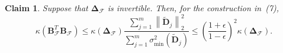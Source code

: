\documentclass[journal,draftcls,onecolumn]{IEEEtran}
\theoremstyle{mystyle}
\newtheorem{claim}{Claim}
\begin{document}

\begin{claim}
\label{claim:cond_num}
Suppose that $\mathbf{\Delta}_{\mathcal{F}}$ is invertible. Then, for the construction in~(7),
$$
\kappa\!\left(\mathbf{B}_{\mathcal{F}}^{T}\mathbf{B}_{\mathcal{F}}\right)
\leq
\kappa\!\left(\mathbf{\Delta}_{\mathcal{F}}\right)
\frac{\sum_{j=1}^{m}\left\|\tilde{\mathbf{D}}_{j}\right\|_{2}^{2}}
{\sum_{j=1}^{m}\sigma_{\min}^{2}\!\left(\tilde{\mathbf{D}}_{j}\right)}
\leq
\left(\frac{1+\epsilon}{1-\epsilon}\right)^{2}
\kappa\!\left(\mathbf{\Delta}_{\mathcal{F}}\right).
$$
\end{claim}

\end{document}
